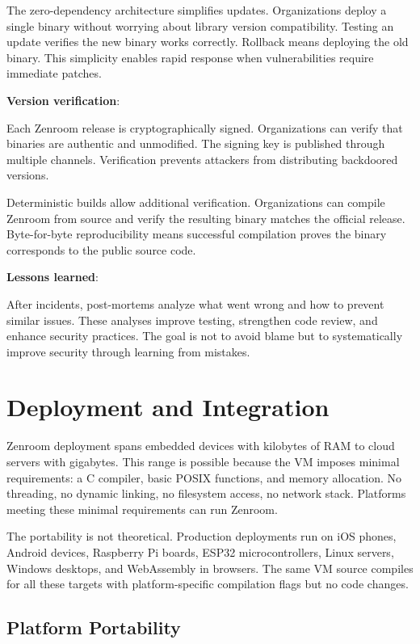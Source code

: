 The zero-dependency architecture simplifies updates. Organizations
deploy a single binary without worrying about library version
compatibility. Testing an update verifies the new binary works
correctly. Rollback means deploying the old binary. This simplicity
enables rapid response when vulnerabilities require immediate patches.

\textbf{Version verification}:

Each Zenroom release is cryptographically signed. Organizations can
verify that binaries are authentic and unmodified. The signing key is
published through multiple channels. Verification prevents attackers
from distributing backdoored versions.

Deterministic builds allow additional verification. Organizations can
compile Zenroom from source and verify the resulting binary matches
the official release. Byte-for-byte reproducibility means successful
compilation proves the binary corresponds to the public source code.

\textbf{Lessons learned}:

After incidents, post-mortems analyze what went wrong and how to
prevent similar issues. These analyses improve testing, strengthen
code review, and enhance security practices. The goal is not to avoid
blame but to systematically improve security through learning from
mistakes.

\section{Deployment and Integration}

Zenroom deployment spans embedded devices with kilobytes of RAM to
cloud servers with gigabytes. This range is possible because the VM
imposes minimal requirements: a C compiler, basic POSIX functions, and
memory allocation. No threading, no dynamic linking, no filesystem
access, no network stack. Platforms meeting these minimal requirements
can run Zenroom.

The portability is not theoretical. Production deployments run on iOS
phones, Android devices, Raspberry Pi boards, ESP32 microcontrollers,
Linux servers, Windows desktops, and WebAssembly in browsers. The same
VM source compiles for all these targets with platform-specific
compilation flags but no code changes.

\subsection{Platform Portability}

